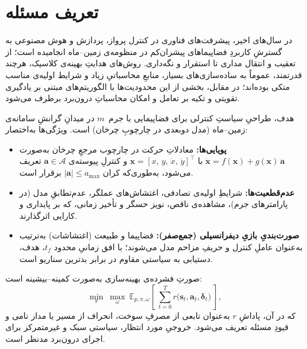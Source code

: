 \section{تعریف مسئله}\label{sec:problem_statement}
\noindent
در سال‌های اخیر، پیشرفت‌های فناوری در کنترل پرواز، پردازش و هوش مصنوعی به گسترشِ کاربردِ فضاپیماهای پیشران‌کم در منظومه‌ی زمین–ماه انجامیده است؛ از تعقیب و انتقال مداری تا استقرار و نگه‌داری. روش‌های هدایتِ بهینه‌ی کلاسیک، هرچند قدرتمند، عموماً به ساده‌سازی‌های بسیار، منابعِ محاسباتیِ زیاد و شرایط اولیه‌ی مناسب متکی بوده‌اند؛ در مقابل، بخشی از این محدودیت‌ها با الگوریتم‌های مبتنی بر یادگیری تقویتی و تکیه بر تعامل و امکان محاسباتِ {درون‌برد} برطرف می‌شود.

هدف، طراحیِ سیاستِ کنترلی برای فضاپیمایی با جرم~$m$ در میدانِ گرانشِ سامانه‌ی زمین–ماه (مدل دوبعدی در چارچوبِ چرخان) است. ویژگی‌ها به‌اختصار:

\begin{itemize}
  \item \textbf{پویایی‌ها:} معادلاتِ حرکت در چارچوب مرجعِ چرخان به‌صورت
  {$\dot{\boldsymbol{x}} = f(\boldsymbol{x}) + g(\boldsymbol{x})\,\boldsymbol{a}$}
  با $\boldsymbol{x}=[x,\,y,\,\dot x,\,\dot y]^\top$ و کنترلِ پیوسته‌ی $\boldsymbol{a}\in\mathcal{A}$ تعریف می‌شود، به‌طوری‌که کران
   $|\boldsymbol{a}|\le a_{\max}$
   برقرار است.
  \item \textbf{عدم‌قطعیت‌ها:} شرایطِ اولیه‌ی تصادفی، اغتشاش‌های عملگر، عدم‌تطابقِ مدل (در پارامترهای جرم)، مشاهده‌ی ناقص، نویز حسگر و تأخیر زمانی، که بر پایداری و کارایی اثرگذارند.
  \item \textbf{صورت‌بندیِ بازیِ دیفرانسیلی (جمع‌صفر):} فضاپیما و طبیعت (اغتشاشات) به‌ترتیب به‌عنوان عاملِ کنترل و {حریفِ مزاحم} مدل می‌شوند؛ با افق زمانیِ محدود {$t_f$}، هدف، دستیابی به سیاستی مقاوم در برابر بدترین سناریو است.
\end{itemize}

صورتِ فشرده‌ی بهینه‌سازی به‌صورت کمینه–بیشینه است:
\begin{equation}
  \min_{\pi}\ \max_{\omega}\ \mathbb{E}_{p,\pi,\omega}\!\left[\ \sum_{t=0}^{T} r\big(\boldsymbol{s}_t,\boldsymbol{a}_t,\boldsymbol{\delta}_t\big)\ \right],
\end{equation}
که در آن، پاداشِ $r$ به‌عنوان تابعی از {مصرفِ سوخت}، {انحراف از مسیر یا مدار نامی} و {قیودِ مسئله} تعریف می‌شود. خروجیِ مورد انتظار، سیاستی سبک و غیرمتمرکز برای اجرای {درون‌برد} مدنظر است.
